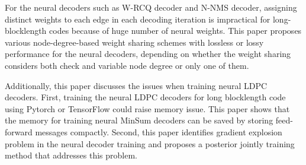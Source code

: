 \documentclass [PhD] {uclathes}
\begin{document}
For the neural decoders such as W-RCQ decoder and N-NMS decoder, assigning distinct weights to each edge in each decoding iteration is impractical for long-blocklength codes because of huge number of neural weights.
This paper proposes various node-degree-based weight sharing schemes with  lossless or lossy performance for the neural decoders, depending on whether the weight sharing considers both check and variable node degree or only one of them. 

Additionally, this paper discusses the issues when training neural LDPC decoders. First, training the neural LDPC decoders for long blocklength code using Pytorch or TensorFlow could raise memory issue. This paper shows that the memory for training neural MinSum decoders can be saved by storing feed-forward messages compactly. Second, this paper identifies gradient explosion problem in the neural decoder training and proposes a  posterior jointly training method that addresses this problem. 



%
\end{document}
